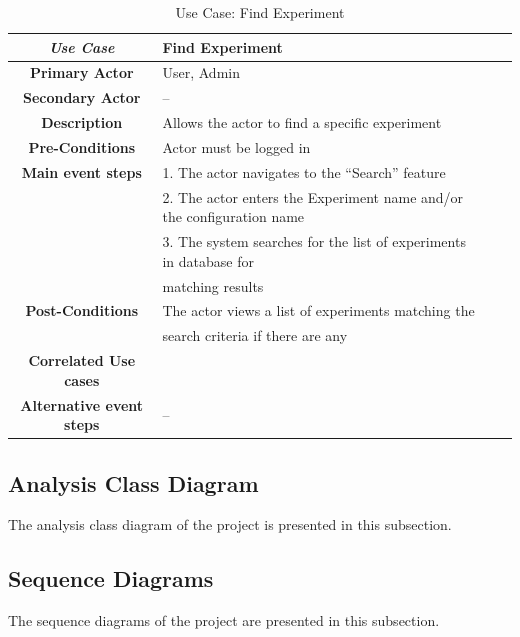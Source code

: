 \begin{table}[ht!]
    \centering
    \caption{Use Case: Find Experiment}
    \begin{tabular}{|Sl|Sl|}
        \hline
        \textbf{\textit{Use Case}}       & \textbf{Find Experiment}                                             \\ \hline
        \textbf{Primary Actor}           & User, Admin                                                          \\ \hline
        \textbf{Secondary Actor}         & --                                                                   \\ \hline
        \textbf{Description}             & Allows the actor to find a specific experiment                        \\ \hline
        \textbf{Pre-Conditions}          & Actor must be logged in                                              \\ \hline
        \textbf{Main event steps}        & 1. The actor navigates to the “Search” feature                        \\
                                         & 2. The actor enters the Experiment name and/or the configuration name \\
                                         & 3. The system searches for the list of experiments in database for   \\
                                         & matching results                                                     \\ \hline
        \textbf{Post-Conditions}         & The actor views a list of experiments matching the                    \\
                                         & search criteria if there are any                                     \\ \hline
        \textbf{Correlated Use cases}    &                                                                      \\ \hline
        \textbf{Alternative event steps} & --                                                                   \\ \hline
    \end{tabular}
\end{table}
\subsection{Analysis Class Diagram}

The analysis class diagram of the project is presented in this subsection.

\subsection{Sequence Diagrams}

The sequence diagrams of the project are presented in this subsection.

